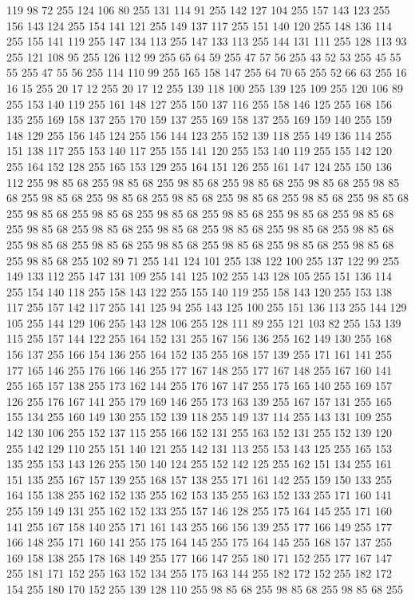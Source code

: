 119 98 72 255 124 106 80 255 131 114 91 255 142 127 104 255 157 143 123 255 156 143 124 255 154 141 121 255 149 137 117 255 151 140 120 255 148 136 114 255 155 141 119 255 147 134 113 255 147 133 113 255 144 131 111 255 128 113 93 255 121 108 95 255 126 112 99 255 65 64 59 255 47 57 56 255 43 52 53 255 45 55 55 255 47 55 56 255 114 110 99 255 165 158 147 255 64 70 65 255 52 66 63 255 16 16 15 255 20 17 12 255 20 17 12 255 139 118 100 255 139 125 109 255 120 106 89 255 153 140 119 255 161 148 127 255 150 137 116 255 158 146 125 255 168 156 135 255 169 158 137 255 170 159 137 255 169 158 137 255 169 159 140 255 159 148 129 255 156 145 124 255 156 144 123 255 152 139 118 255 149 136 114 255 151 138 117 255 153 140 117 255 155 141 120 255 153 140 119 255 155 142 120 255 164 152 128 255 165 153 129 255 164 151 126 255 161 147 124 255 150 136 112 255 98 85 68 255 98 85 68 255 98 85 68 255 98 85 68 255 98 85 68 255 98 85 68 255 98 85 68 255 98 85 68 255
98 85 68 255 98 85 68 255 98 85 68 255 98 85 68 255 98 85 68 255 98 85 68 255 98 85 68 255 98 85 68 255 98 85 68 255 98 85 68 255 98 85 68 255 98 85 68 255 98 85 68 255 98 85 68 255 98 85 68 255 98 85 68 255 98 85 68 255 98 85 68 255 98 85 68 255 98 85 68 255 98 85 68 255 98 85 68 255 98 85 68 255 102 89 71 255 141 124 101 255 138 122 100 255 137 122 99 255 149 133 112 255 147 131 109 255 141 125 102 255 143 128 105 255 151 136 114 255 154 140 118 255 158 143 122 255 155 140 119 255 158 143 120 255 153 138 117 255 157 142 117 255 141 125 94 255 143 125 100 255 151 136 113 255 144 129 105 255 144 129 106 255 143 128 106 255 128 111 89 255 121 103 82 255 153 139 115 255 157 144 122 255 164 152 131 255 167 156 136 255 162 149 130 255 168 156 137 255 166 154 136 255 164 152 135 255 168 157 139 255 171 161 141 255 177 165 146 255 176 166 146 255 177 167 148 255 177 167 148 255 167 160 141 255 165 157 138 255 173 162 144 255 176 167 147 255
175 165 140 255 169 157 126 255 176 167 141 255 179 169 146 255 173 163 139 255 167 157 131 255 165 155 134 255 160 149 130 255 152 139 118 255 149 137 114 255 143 131 109 255 142 130 106 255 152 137 115 255 166 152 131 255 163 152 131 255 152 139 120 255 142 129 110 255 151 140 121 255 142 131 113 255 153 143 125 255 165 153 135 255 153 143 126 255 150 140 124 255 152 142 125 255 162 151 134 255 161 151 135 255 167 157 139 255 168 157 138 255 171 161 142 255 159 150 133 255 164 155 138 255 162 152 135 255 162 153 135 255 163 152 133 255 171 160 141 255 159 149 131 255 162 152 133 255 157 146 128 255 175 164 145 255 171 160 141 255 167 158 140 255 171 161 143 255 166 156 139 255 177 166 149 255 177 166 148 255 171 160 141 255 175 164 145 255 175 164 145 255 168 157 137 255 169 158 138 255 178 168 149 255 177 166 147 255 180 171 152 255 177 167 147 255 181 171 152 255 163 152 134 255 175 163 144 255 182 172 152 255 182 172 154 255 180 170 152 255 139 128 110 255 98 85 68 255 98 85 68 255 98 85 68 255
